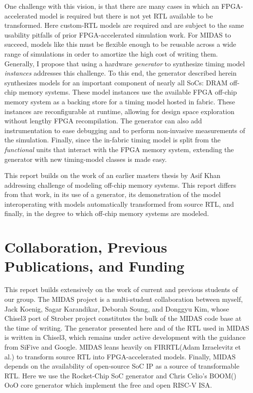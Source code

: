 One challenge with this vision, is that there are many cases in which an
FPGA-accelerated model is required but there is not yet RTL available to be
transformed. Here custom-RTL models are required and are subject to the same
usability pitfalls of prior FPGA-accelerated simulation work. For MIDAS to
succeed, models like this must be flexible enough to be reusable across a wide
range of simulations in order to amortize the high cost of writing them.
Generally, I propose that using a hardware \emph{generator} to synthesize
timing model \emph{instances} addresses this challenge. To this end, the
generator described herein synthesizes models for an important component of
nearly all SoCs: DRAM off-chip memory systems. These model instances use the
available FPGA off-chip memory system as a backing store for a timing model
hosted in fabric. These instances are reconfigurable at runtime, allowing for
design space exploration without lengthy FPGA recompilation. The generator can
also add instrumentation to ease debugging and to perform non-invasive
measurements of the simulation. Finally, since the in-fabric timing model is
split from the \emph{functional} units that interact with the FPGA memory
system, extending the generator with new timing-model classes is made easy.

This report builds on the work of an earlier masters thesis by Asif
Khan\cite{khanmasters} addressing challenge of modeling off-chip memory
systems. This report differs from that work, in its use of a generator, its
demonstration of the model interoperating with models automatically transformed
from source RTL, and finally, in the degree to which off-chip memory systems
are modeled.

\section{Collaboration, Previous Publications, and Funding}

This report builds extensively on the work of current and previous students of
our group. The MIDAS project is a multi-student collaboration between myself,
Jack Koenig, Sagar Karandikar, Deborah Soung, and Donggyu Kim, whose Chisel3
port of Strober\cite{strober} project constitutes the bulk of the MIDAS code
base at the time of writing. The generator presented here and of the RTL used
in MIDAS is written in Chisel3\cite{chisel}, which remains under active
development with the guidance from SiFive and Google. MIDAS leans heavily on
FIRRTL\cite{firrtl}(Adam Izraelevitz et al.) to transform source RTL into
FPGA-accelerated models. Finally, MIDAS depends on the availability of
open-source SoC IP as a source of transformable RTL. Here we use the
Rocket-Chip\cite{rocketchip} SoC generator and Chris Celio's BOOM(\cite{boom})
OoO core generator which implement the free and open RISC-V ISA.


